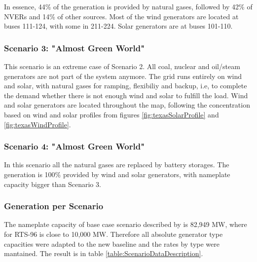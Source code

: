 \documentclass[12pt,LUDisStyle,twosided]{book}
\begin{document}
In essence, 44\% of the generation is provided by natural gases, followed by 42\% of NVERs and 14\% of other sources. Most of the wind generators are located at buses 111-124, with some in 211-224. Solar generators are at buses 101-110.


\subsubsection{Scenario 3: "Almost Green World"}

This scenario is an extreme case of Scenario 2. All coal, nuclear and oil/steam generators are not part of the system anymore. The grid runs entirely on wind and solar, with natural gases for ramping, flexibiliy and backup, i.e, to complete the demand whether there is not enough wind and solar to fulfill the load. Wind and solar generators are located throughout the map, following the concentration based on wind and solar profiles from figures \ref{fig:texasSolarProfile} and \ref{fig:texasWindProfile}.

\subsubsection{Scenario 4: "Almost Green World"}

In this scenario all the natural gases are replaced by battery storages. The generation is 100\% provided by wind and solar generators, with nameplate capacity bigger than Scenario 3.

\subsubsection{Generation per Scenario}

The nameplate capacity of base case scenario described by \citeauthor{shavel} is 82,949 MW, where for RTS-96 is close to 10,000 MW. Therefore all absolute generator type capacities were adapted to the new baseline and the rates by type were mantained. The result is in table \ref{table:ScenarioDataDescription}.
\end{document}
